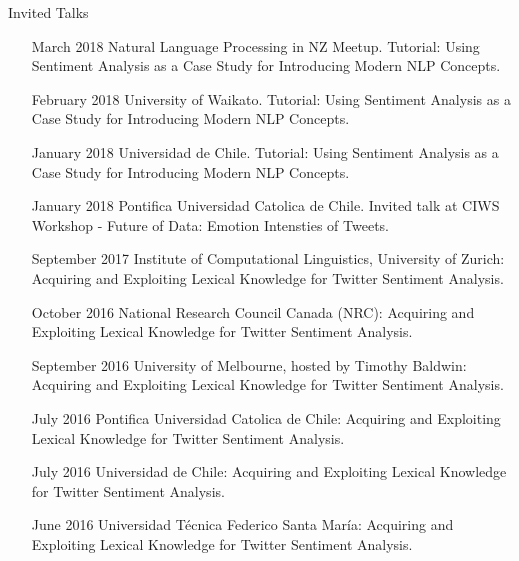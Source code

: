 \documentclass[handout]{beamer}
\begin{document}
\begin{frame}{Invited Talks}
\begin{tiny}
  \begin{enumerate}
\item [March 2018] Natural Language Processing in NZ Meetup. Tutorial: Using Sentiment Analysis as a Case Study for Introducing Modern NLP Concepts.

\item [February 2018] University of Waikato. Tutorial: Using Sentiment Analysis as a Case Study for Introducing Modern NLP Concepts.

\item [January 2018]Universidad de Chile. Tutorial: Using Sentiment Analysis as a Case Study for Introducing Modern NLP Concepts.

\item [January 2018] Pontifica Universidad Catolica de Chile. Invited talk at CIWS Workshop - Future of Data: Emotion Intensties of Tweets.

\item [September 2017] Institute of Computational Linguistics, University of Zurich:  Acquiring and Exploiting Lexical Knowledge for Twitter Sentiment Analysis.

\item [October 2016] National Research Council Canada (NRC):  Acquiring and Exploiting Lexical Knowledge for Twitter Sentiment Analysis.

\item [September 2016] University of Melbourne, hosted by Timothy Baldwin: Acquiring and Exploiting Lexical Knowledge for Twitter Sentiment Analysis.

\item [July 2016] Pontifica Universidad Catolica de Chile:  Acquiring and Exploiting Lexical Knowledge for Twitter Sentiment Analysis.

\item [July 2016] Universidad de Chile:  Acquiring and Exploiting Lexical Knowledge for Twitter Sentiment Analysis.

\item [June 2016] Universidad Técnica Federico Santa María: Acquiring and Exploiting Lexical Knowledge for Twitter Sentiment Analysis. 
  \end{enumerate} 
\end{tiny}

\end{frame}
\end{document}
